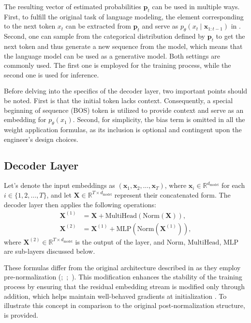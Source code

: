The resulting vector of estimated probabilities \(\mathbf{p}_t\) can be used in multiple ways. First, to fulfill the original task of language modeling, the element corresponding to the next token \(x_t\) can be extracted from \(\mathbf{p}_t\) and serve as \(p_{\theta}(x_t \mid \bm{x}_{1:t-1})\) in . Second, one can sample from the categorical distribution defined by \(\mathbf{p}_t\) to get the next token and thus generate a new sequence from the model, which means that the language model can be used as a generative model. Both settings are commonly used. The first one is employed for the training process, while the second one is used for inference.

Before delving into the specifics of the decoder layer, two important points should be noted. First is that the initial token lacks context. Consequently, a special beginning of sequence (BOS) token is utilized to provide context and serve as an embedding for \(p_\theta(x_1)\). Second, for simplicity, the bias term is omitted in all the weight application formulas, as its inclusion is optional and contingent upon the engineer's design choices.

\subsection{Decoder Layer}

Let's denote the input embeddings as \((\mathbf{x}_1, \mathbf{x}_2, \ldots, \mathbf{x}_{T})\), where \(\mathbf{x}_i \in \mathbb{R}^{d_{\mathrm{model}}}\) for each \(i \in \{1, 2, \ldots, T\}\), and let \(\mathbf{X} \in \mathbb{R}^{T \times d_{\mathrm{model}}}\) represent their concatenated form. The decoder layer then applies the following operations:
\begin{align}
    \mathbf{X}^{(1)} &= \mathbf{X} + \mathrm{MultiHead}(\mathrm{Norm}(\mathbf{X})), \\
    \mathbf{X}^{(2)} &= \mathbf{X}^{(1)} + \mathrm{MLP}(\mathrm{Norm}(\mathbf{X}^{(1)})),
\end{align}
where \(\mathbf{X}^{(2)} \in \mathbb{R}^{T \times d_{\mathrm{model}}}\) is the output of the layer, and \(\mathrm{Norm}\), \(\mathrm{MultiHead}\), \(\mathrm{MLP}\) are sub-layers discussed below.

These formulas differ from the original architecture described in \citet{vaswani2017} as they employ pre-normalization (\cite{baevski2018};~\cite{child2019};~\cite{wang2019}). This modification enhances the stability of the training process by ensuring that the residual embedding stream is modified only through addition, which helps maintain well-behaved gradients at initialization \parencite{xiong2020}. To illustrate this concept in comparison to the original post-normalization structure,  is provided.

